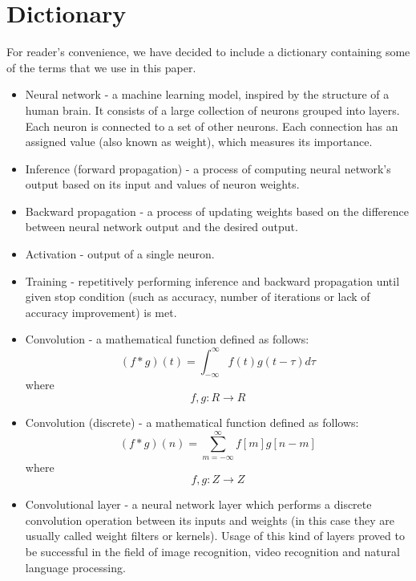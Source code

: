 \documentclass[licencjacka]{pracamgr}
\begin{document}
\chapter{Dictionary}
    For reader's convenience, we have decided to include a dictionary containing some of the terms that we use in this paper. 
    
    \begin{itemize}
        \item Neural network - a machine learning model, inspired by the structure of a human brain. It consists of a large collection of neurons grouped into layers. Each neuron is connected to a set of other neurons. Each connection has an assigned value (also known as weight), which measures its importance.
        
        \item Inference (forward propagation) - a process of computing neural network's output based on its input and values of neuron weights.
        
        \item Backward propagation - a process of updating weights based on the difference between neural network output and the desired output.
        
         \item Activation - output of a single neuron.
        
        \item Training - repetitively performing inference and backward propagation until given stop condition (such as accuracy, number of iterations or lack of accuracy improvement) is met.
               
        \item Convolution - a mathematical function defined as follows: 
        $$ (f* g)(t) = \int_{-\infty}^{\infty} f(t)g(t-\tau)d\tau$$ where $$f,g: R\rightarrow R$$
        
        \item Convolution (discrete) - a mathematical function defined as follows: 
        $$ (f* g)(n) = \sum_{m=-\infty}^{\infty} f[m] g[n-m]$$ where $$f,g: Z\rightarrow Z$$
        
        \item Convolutional layer - a neural network layer which performs a discrete convolution operation between its inputs and weights (in this case they are usually called weight filters or kernels). Usage of this kind of layers proved to be successful in the field of image recognition, video recognition and natural language processing. 	
               

\end{itemize}
\end{document}
